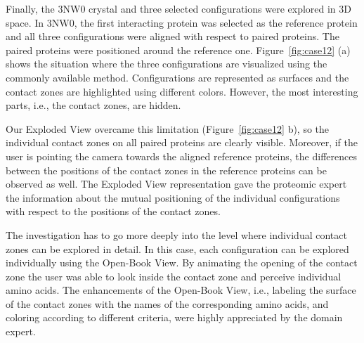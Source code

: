 \documentclass[twocolumn]{bmcart}%
\def\OpBook {Open-Book View\xspace}
\def\ExpView {Exploded View\xspace}
\begin{document}

Finally, the 3NW0 crystal and three selected configurations were explored in 3D space.
In 3NW0, the first interacting protein was selected as the reference protein and all three configurations were aligned with respect to paired proteins.
The paired proteins were positioned around the reference one.
Figure~\ref{fig:case12} (a) shows the situation where the three configurations are visualized using the commonly available method.
Configurations are represented as surfaces and the contact zones are highlighted using different colors.
However, the most interesting parts, i.e., the contact zones, are hidden.

Our \ExpView overcame this limitation (Figure~\ref{fig:case12} b), so the individual contact zones on all paired proteins are clearly visible.
Moreover, if the user is pointing the camera towards the aligned reference proteins, the differences between the positions of the contact zones in the reference proteins can be observed as well.
The \ExpView representation gave the proteomic expert the information about the mutual positioning of the individual configurations with respect to the positions of the contact zones.

The investigation has to go more deeply into the level where individual contact zones can be explored in detail.
In this case, each configuration can be explored individually using the \OpBook.
By animating the opening of the contact zone the user was able to look inside the contact zone and perceive individual amino acids.
The enhancements of the \OpBook, i.e., labeling the surface of the contact zones with the names of the corresponding amino acids, and coloring according to different criteria, were highly appreciated by the domain expert.
\end{document}
